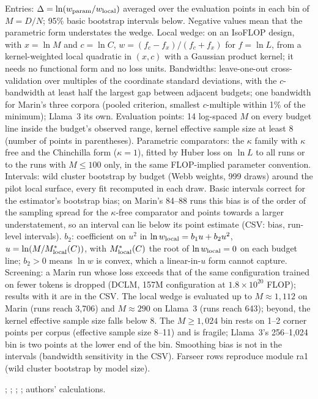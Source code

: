 \begin{table}[tp]
\begin{tablenotes}
Entries: $\Delta=\ln(w_{\rm param}/w_{\rm local})$ averaged over the evaluation points in each bin of $M=D/N$; 95\% basic bootstrap intervals below. Negative values mean that the parametric form understates the wedge. Local wedge: on an IsoFLOP design, with $x=\ln M$ and $c=\ln C$, $w=(f_c-f_x)/(f_c+f_x)$ for $f=\ln L$, from a kernel-weighted local quadratic in $(x,c)$ with a Gaussian product kernel; it needs no functional form and no loss units. Bandwidths: leave-one-out cross-validation over multiples of the coordinate standard deviations, with the $c$-bandwidth at least half the largest gap between adjacent budgets; one bandwidth for Marin's three corpora (pooled criterion, smallest $c$-multiple within 1\% of the minimum); Llama~3 its own. Evaluation points: 14 log-spaced $M$ on every budget line inside the budget's observed range, kernel effective sample size at least 8 (number of points in parentheses). Parametric comparators: the $\kappa$ family with $\kappa$ free and the Chinchilla form ($\kappa=1$), fitted by Huber loss on $\ln L$ to all runs or to the runs with $M\le100$ only, in the same FLOP-implied parameter convention. Intervals: wild cluster bootstrap by budget (Webb weights, 999 draws) around the pilot local surface, every fit recomputed in each draw. Basic intervals correct for the estimator's bootstrap bias; on Marin's 84--88 runs this bias is of the order of the sampling spread for the $\kappa$-free comparator and points towards a larger understatement, so an interval can lie below its point estimate (CSV: bias, run-level intervals). $b_2$: coefficient on $u^2$ in $\ln w_{\rm local}=b_1u+b_2u^2$, $u=\ln(M/M^*_{\rm local}(C))$, with $M^*_{\rm local}(C)$ the root of $\ln w_{\rm local}=0$ on each budget line; $b_2>0$ means $\ln w$ is convex, which a linear-in-$u$ form cannot capture. Screening: a Marin run whose loss exceeds that of the same configuration trained on fewer tokens is dropped (DCLM, 157M configuration at $1.8\times10^{20}$ FLOP); results with it are in the CSV. The local wedge is evaluated up to $M\approx1,112$ on Marin (runs reach 3,706) and $M\approx290$ on Llama~3 (runs reach 643); beyond, the kernel effective sample size falls below 8. The $M\ge1{,}024$ bin rests on 1--2 corner points per corpus (effective sample size 8--11) and is fragile; Llama~3's 256--1,024 bin is two points at the lower end of the bin. Smoothing bias is not in the intervals (bandwidth sensitivity in the CSV). Farseer rows reproduce module ra1 (wild cluster bootstrap by model size).
\end{tablenotes}

\begin{tablenotes}[Source]
\citet{li2025predictableb}; \citet{marin2026ladders}; \citet{grattafiori2024llama}; \citet{czech2026llama3isoflop}; authors' calculations.
\end{tablenotes}
\end{table}
